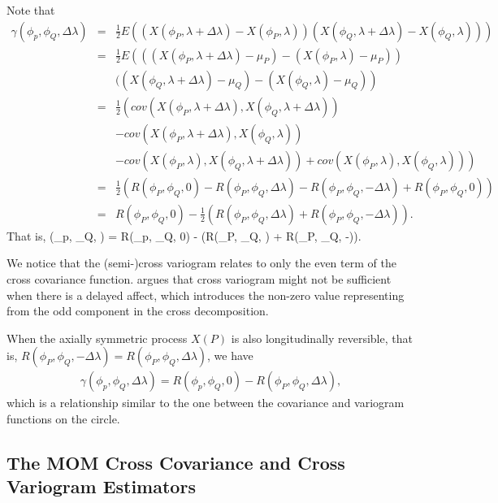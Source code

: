 Note that
\begin{eqnarray*}
\gamma(\phi_p, \phi_Q, \Delta\lambda) &=& \frac{1}{2}E\left((X(\phi_P, \lambda+\Delta \lambda) - X(\phi_P, \lambda))(X(\phi_Q, \lambda+\Delta \lambda) - X(\phi_Q, \lambda))\right) \\
&=& \frac{1}{2} E\left(((X(\phi_P, \lambda+\Delta \lambda) - \mu_P) - (X(\phi_P, \lambda)- \mu_P)) \right. \\
& & \left.((X(\phi_Q, \lambda+\Delta \lambda) - \mu_Q) - (X(\phi_Q, \lambda) - \mu_Q)\right) \\
&=& \frac{1}{2} \left(cov(X(\phi_P, \lambda+\Delta \lambda), X(\phi_Q, \lambda+\Delta \lambda)) \right. \\
& &- \left.cov(X(\phi_P, \lambda+\Delta \lambda), X(\phi_Q, \lambda)) \right. \\
& & \left. - cov(X(\phi_P, \lambda), X(\phi_Q, \lambda + \Delta \lambda)) + cov(X(\phi_P, \lambda), X(\phi_Q, \lambda))  \right) \\
&=& \frac{1}{2} \left(R(\phi_P, \phi_Q, 0) - R(\phi_P, \phi_Q, \Delta \lambda) - R(\phi_P, \phi_Q, -\Delta \lambda) + R(\phi_P, \phi_Q, 0)  \right) \\
&=& R(\phi_P, \phi_Q, 0) - \frac{1}{2}(R(\phi_P, \phi_Q, \Delta \lambda) + R(\phi_P, \phi_Q, -\Delta \lambda)).
\end{eqnarray*}
That is, 				
\beq
\gamma(\phi_p, \phi_Q, \Delta\lambda) =  R(\phi_p, \phi_Q, 0) - (R(\phi_P, \phi_Q, \Delta \lambda) + R(\phi_P, \phi_Q, -\Delta \lambda)).
\eeq

We notice that the (semi-)cross variogram relates to only the even term of the cross covariance function. \cite{Wackernagel2013} argues that cross variogram might not be sufficient when there is a delayed affect, which introduces the non-zero value representing from the odd component in the cross \cov decomposition.

When the axially symmetric process $X(P)$ is also longitudinally reversible, that is, $R(\phi_P, \phi_Q, -\Delta \lambda) = R(\phi_P, \phi_Q, \Delta \lambda)$, we have
\begin{eqnarray*}
\gamma(\phi_p, \phi_Q, \Delta\lambda) =  R(\phi_p, \phi_Q, 0) - R(\phi_P, \phi_Q, \Delta \lambda),
\end{eqnarray*}
which is a relationship similar to the one between the covariance and variogram functions on the circle.


\subsection{The MOM Cross Covariance and Cross Variogram Estimators}

